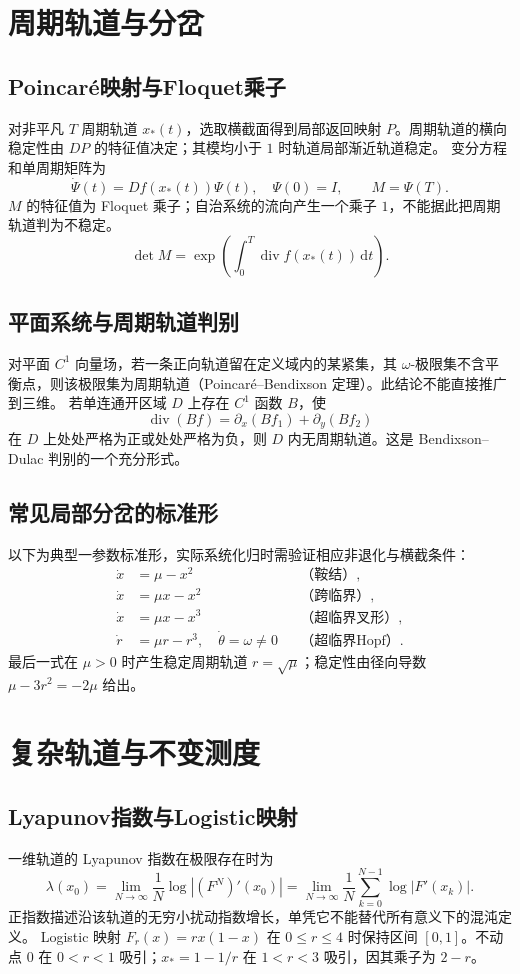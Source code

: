 \documentclass[../main.tex]{subfiles}
\begin{document}
\section{周期轨道与分岔}
\subsection{Poincaré映射与Floquet乘子}
对非平凡 $T$ 周期轨道 $x_*(t)$，选取横截面得到局部返回映射 $P$。周期轨道的横向稳定性由 $DP$ 的特征值决定；其模均小于 $1$ 时轨道局部渐近轨道稳定。
变分方程和单周期矩阵为
\[
\dot\Psi(t)=Df(x_*(t))\Psi(t),\quad\Psi(0)=I,\qquad M=\Psi(T).
\]
$M$ 的特征值为 Floquet 乘子；自治系统的流向产生一个乘子 $1$，不能据此把周期轨道判为不稳定。
\[
\det M=\exp\!\left(\int_0^T\operatorname{div}f(x_*(t))\,\mathrm dt\right).
\]
\subsection{平面系统与周期轨道判别}
对平面 $C^1$ 向量场，若一条正向轨道留在定义域内的某紧集，其 $\omega$-极限集不含平衡点，则该极限集为周期轨道（Poincaré--Bendixson 定理）。此结论不能直接推广到三维。
若单连通开区域 $D$ 上存在 $C^1$ 函数 $B$，使
\[
\operatorname{div}(Bf)=\partial_x(Bf_1)+\partial_y(Bf_2)
\]
在 $D$ 上处处严格为正或处处严格为负，则 $D$ 内无周期轨道。这是 Bendixson--Dulac 判别的一个充分形式。
\subsection{常见局部分岔的标准形}
以下为典型一参数标准形，实际系统化归时需验证相应非退化与横截条件：
\begin{align*}
\dot x&=\mu-x^2 &&\text{（鞍结）},\\
\dot x&=\mu x-x^2 &&\text{（跨临界）},\\
\dot x&=\mu x-x^3 &&\text{（超临界叉形）},\\
\dot r&=\mu r-r^3,\quad\dot\theta=\omega\ne0 &&\text{（超临界Hopf）}.
\end{align*}
最后一式在 $\mu>0$ 时产生稳定周期轨道 $r=\sqrt\mu$；稳定性由径向导数 $\mu-3r^2=-2\mu$ 给出。
\section{复杂轨道与不变测度}
\subsection{Lyapunov指数与Logistic映射}
一维轨道的 Lyapunov 指数在极限存在时为
\[
\lambda(x_0)=\lim_{N\to\infty}\frac1N\log|(F^N)'(x_0)|
=\lim_{N\to\infty}\frac1N\sum_{k=0}^{N-1}\log|F'(x_k)|.
\]
正指数描述沿该轨道的无穷小扰动指数增长，单凭它不能替代所有意义下的混沌定义。
Logistic 映射 $F_r(x)=rx(1-x)$ 在 $0\le r\le4$ 时保持区间 $[0,1]$。不动点 $0$ 在 $0<r<1$ 吸引；$x_*=1-1/r$ 在 $1<r<3$ 吸引，因其乘子为 $2-r$。
\end{document}

